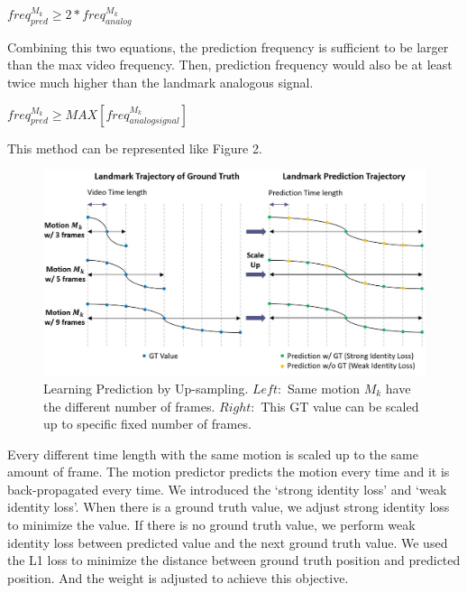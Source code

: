 \documentclass[10pt,twocolumn,letterpaper]{article}
\begin{document}
\bigskip
\begin{center}
$freq_{pred}^{M_k} \geq 2 \ast freq_{analog}^{M_k} $
\end{center}
\bigskip

Combining this two equations, the prediction frequency is sufficient to be larger than the max video frequency. Then, prediction frequency would also be at least twice much higher than the landmark analogous signal.

\bigskip
\begin{center}
$freq_{pred}^{M_k} \geq MAX[freq_{analog signal}^{M_k}] $
\end{center}
\bigskip

This method can be represented like Figure 2.

\begin{figure}[h]
\begin{center}
\includegraphics [scale=0.33] {images/upsample1.JPG}
\end{center}
\caption{Learning Prediction by Up-sampling. $Left:$ Same motion $M_k$ have the different number of frames. $Right:$ This GT value can be scaled up to specific fixed number of frames.}
\label{fig:short}
\label{fig:onecol}
\end{figure}


Every different time length with the same motion is scaled up to the same amount of frame. The motion predictor predicts the motion every time and it is back-propagated every time. We introduced the ‘strong identity loss’ and ‘weak identity loss’. When there is a ground truth value, we adjust strong identity loss to minimize the value. If there is no ground truth value, we perform weak identity loss between predicted value and the next ground truth value. We used the L1 loss to minimize the distance between ground truth position and predicted position. And the weight is adjusted to achieve this objective.
\end{document}
